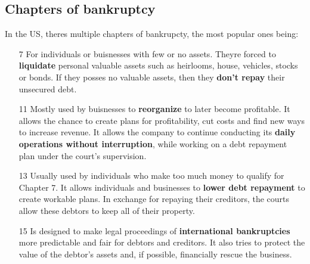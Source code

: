 \subsection{Chapters of bankruptcy} 
In the US, theres multiple chapters of bankrupcty, the most popular ones being:
\begin{itemize}
	\item[7]For individuals or buisnesses with few or no assets. Theyre forced to \textbf{liquidate} personal valuable assets such as heirlooms, house, vehicles, stocks or bonds. If they posses no valuable  assets, then they \textbf{don't repay} their unsecured debt.
	\item[11] Mostly used by buisnesses to \textbf{reorganize} to later become profitable. It allows the chance to create plans for profitability, cut costs and find new ways to increase revenue. It allows the company to continue conducting its \textbf{daily operations without interruption}, while working on a debt repayment plan under the court's supervision.
	\item[13] Usually used by individuals who make too much money to qualify for Chapter 7. It allows individuals and businesses to \textbf{lower debt repayment} to create workable plans. In exchange for repaying their creditors, the courts allow these debtors to keep all of their property.
	\item[15] Is designed to make legal proceedings of \textbf{international bankruptcies} more predictable and fair for debtors and creditors. It also tries to protect the value of the debtor's assets and, if possible, financially rescue the business.
\end{itemize}
